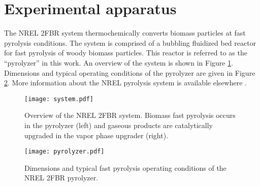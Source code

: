 
\section{Experimental apparatus}

The NREL 2FBR system thermochemically converts biomass particles at fast pyrolysis conditions. The system is comprised of a bubbling fluidized bed reactor for fast pyrolysis of woody biomass particles. This reactor is referred to as the ``pyrolyzer'' in this work. An overview of the system is shown in Figure \ref{fig:nrel-system}. Dimensions and typical operating conditions of the pyrolyzer are given in Figure \ref{fig:nrel-pyrolyzer}. More information about the NREL pyrolysis system is available elsewhere \cite{Howe-2015, Trendewicz-2015}.

\begin{figure}[ht]
    \centering
    \texttt{[image: system.pdf]}
    \caption{Overview of the NREL 2FBR system. Biomass fast pyrolysis occurs in the pyrolyzer (left) and gaseous products are catalytically upgraded in the vapor phase upgrader (right).}
    \label{fig:nrel-system}
\end{figure}

\begin{figure}[ht]
    \centering
    \texttt{[image: pyrolyzer.pdf]}
    \caption{Dimensions and typical fast pyrolysis operating conditions of the NREL 2FBR pyrolyzer.}
    \label{fig:nrel-pyrolyzer}
\end{figure}
